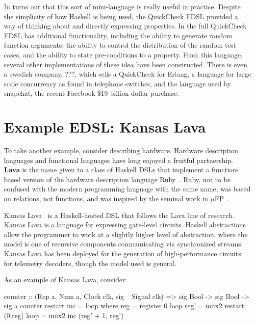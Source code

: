 \documentclass[11pt]{article}
\begin{document}
In turns out that this sort of mini-language is really useful in practice.
Despite the simplicity of how Haskell is being used, the QuickCheck EDSL
provided a way of thinking about and directly expressing properties.
In the full QuickCheck EDSL has additional functionality, including
the ability to generate random function arguments, the ability to control
the distribution of the random test cases, and the ability to state pre-conditions
to a property. From this language, several other implementations of
these idea have been constructed. There is even a swedish company, ???,
which sells a QuickCheck for Erlang, a language for large scale concurrency
as found in telephone switches, and the language used by snapchat, the recent
Facebook \$19 billion dollar purchase.

\section{Example EDSL: Kansas Lava}\label{sec:KansasLava}

To take another example, consider describing hardware.
Hardware description languages and functional languages have
long enjoyed a fruitful partnership.
{\bf Lava} is the name given to a class of Haskell DSLs
that implement a function-based version of the hardware description
language Ruby~\cite{Jones:90:Ruby,Hutton:93:RubyInterp}. Ruby, not to be confused with the
modern programming language with the same name, was based
on relations, not functions, and was inspired by
the seminal work in $\mu$FP~\cite{Sheeran:84:muFP}.

Kansas Lava~\cite{Gill:13:TypesKansasLava} is a Haskell-hosted DSL
that follows the Lava line of research.
Kansas Lava is a language for expressing gate-level circuits.
Haskell abstractions allow the programmer to work at
a slightly higher level of abstraction, where the model
is one of recursive components communicating via synchronized streams.
Kansas Lava has been deployed for the generation of high-performance circuits for telemetry decoders,
though the model used is general.

As an example of Kansas Lava, consider:

\begin{Code}

counter :: (Rep a, Num a, Clock clk, sig ~ Signal clk) => sig Bool -> sig Bool -> sig a
counter restart inc = loop
   where reg = register 0 loop
	 reg' = mux2 restart (0,reg)
	 loop = mux2 inc (reg' + 1, reg')
\end{Code}
\end{document}
